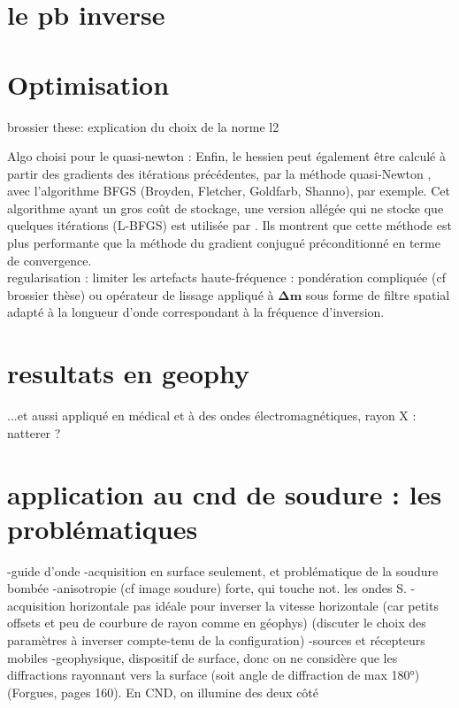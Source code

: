 \section{le pb inverse}

\section{Optimisation}

brossier these: explication du choix de la norme l2

Algo choisi pour le quasi-newton : Enfin, le hessien peut également être calculé à partir des gradients des itérations précédentes, par la méthode quasi-Newton \citep{nocedal}, avec l'algorithme BFGS (Broyden, Fletcher, Goldfarb, Shanno), par exemple. Cet algorithme ayant un gros coût de stockage, une version allégée qui ne stocke que quelques itérations (L-BFGS) est utilisée par \cite{brossier_2009}. Ils montrent que cette méthode est plus performante que la méthode du gradient conjugué préconditionné en terme de convergence. \\

regularisation : limiter les artefacts haute-fréquence : pondération compliquée (cf brossier thèse) ou opérateur de lissage appliqué à $\bm{\Delta m}$ sous forme de filtre spatial adapté à la longueur d'onde correspondant à la fréquence d'inversion.

\section{resultats en geophy}

...et aussi appliqué en médical et à des ondes électromagnétiques, rayon X : natterer ?

\section{application au cnd de soudure : les problématiques}

-guide d'onde
-acquisition en surface seulement, et problématique de la soudure bombée
-anisotropie (cf image soudure) forte, qui touche not. les ondes S.
-acquisition horizontale pas idéale pour inverser la vitesse horizontale (car petits offsets et peu de courbure de rayon comme en géophys) (discuter le choix des paramètres à inverser compte-tenu de la configuration)
-sources et récepteurs mobiles 
-geophysique, dispositif de surface, donc on ne considère que les diffractions rayonnant vers la surface (soit angle de diffraction de max 180°)(Forgues, pages 160). En CND, on illumine des deux côté


